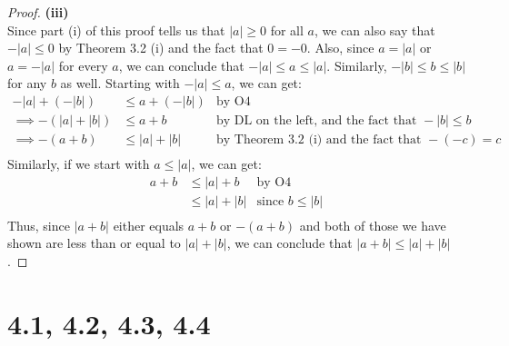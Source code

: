 \documentclass[10pt,a4paper]{article}
\theoremstyle{definition}
\begin{document}
\begin{proof}{\textbf{(iii)}}
\\Since part (i) of this proof tells us that $|a| \geq 0$ for all $a$, we can also say that $-|a| \leq 0$ by Theorem 3.2 (i) and the fact that $0 = -0$. Also, since $a = |a|$ or $a = -|a|$ for every $a$, we can conclude that $-|a| \leq a \leq |a|$. Similarly, $-|b| \leq b \leq |b|$ for any $b$ as well. Starting with $-|a| \leq a$, we can get:
\begin{align*}
-|a| + (-|b|) &\leq a + (-|b|) &\text{by O4}\\
\implies -(|a| + |b|) &\leq a + b &\text{by DL on the left, and the fact that }-|b| \leq b\\
\implies -(a + b) &\leq |a| + |b| &\text{by Theorem 3.2 (i) and the fact that } -(-c) = c\\
\end{align*}
Similarly, if we start with $a \leq |a|$, we can get:
\begin{align*}
a + b &\leq |a| + b &\text{by O4}\\
&\leq |a| + |b| &\text{since } b \leq |b|\\
\end{align*}
Thus, since $|a + b|$ either equals $a + b$ or $-(a + b)$ and both of those we have shown are less than or equal to $|a| + |b|$, we can conclude that $|a + b| \leq |a| + |b|$. 
\end{proof}

\section*{4.1, 4.2, 4.3, 4.4}
\end{document}
